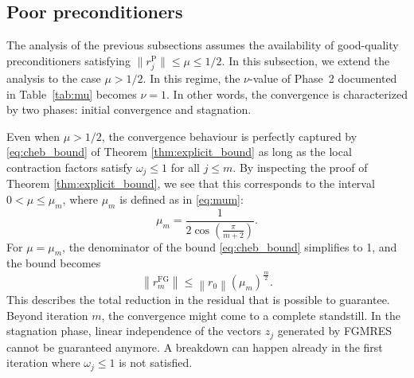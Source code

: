 \documentclass{siamart251216}
\begin{document}
{\subsection{Poor preconditioners}


The analysis of the previous subsections assumes the availability of good-quality preconditioners satisfying $\|r_j^{\mathrm{P}}\| \leq \mu \leq 1/2$. In this subsection, we extend the analysis to the case $\mu > 1/2$. In this regime, the $\nu$-value of Phase~2 documented in Table~\ref{tab:mu} becomes $\nu=1$. In other words, the convergence is characterized by two phases: initial convergence and stagnation. 


Even when $\mu > 1/2$, the convergence behaviour is perfectly captured by \eqref{eq:cheb_bound} of Theorem \ref{thm:explicit_bound} as long as the local contraction factors satisfy $\omega_j \leq 1$ for all $j \leq m$. By inspecting the proof of Theorem \ref{thm:explicit_bound}, we see that this corresponds to the interval $0 < \mu \leq \mu_m$, where $\mu_m$ is defined as in \eqref{eq:mum}:
    \begin{equation*}
        \mu_m = \frac{1}{2 \cos\left(\frac{\pi}{m+2}\right)}.
    \end{equation*}
For $\mu=\mu_m$, the denominator of the bound \eqref{eq:cheb_bound} simplifies to 1, %
and the bound becomes
\[
    \left\|r_m^{\mathrm{FG}}\right\| \leq \left\|r_0\right\| (\mu_m)^{\frac{m}{2}}.
\]
This describes the total reduction in the residual that is possible to guarantee. Beyond iteration $m$, the convergence might come to a complete standstill.  
In the stagnation phase, linear independence of the vectors $z_j$ generated by FGMRES cannot be guaranteed anymore. A breakdown can happen already in the first iteration where $\omega_j\leq 1$ is not satisfied. 


}
\end{document}
